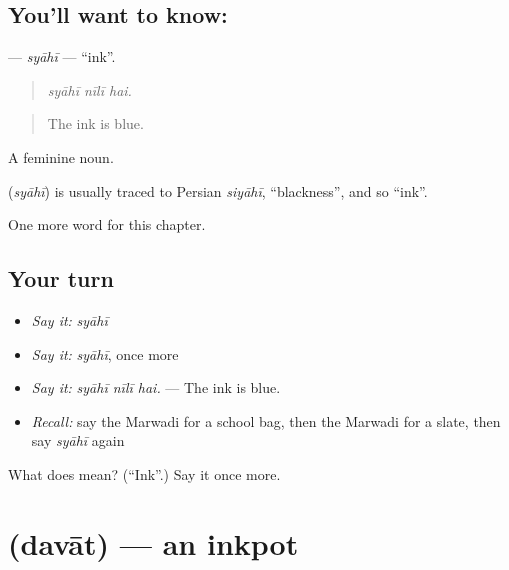 \subsection*{You'll want to know: }
\textbf{} — \emph{syāhī} — \textquotedblleft{}ink\textquotedblright{}.

\begin{quote}
  
\end{quote}

\begin{quote}
\emph{syāhī nīlī hai.}
\end{quote}

\begin{quote}
The ink is blue.
\end{quote}

A feminine noun.

\begin{cousinweb}
\textbf{} (\emph{syāhī}) is usually traced to Persian \emph{siyāhī}, \textquotedblleft{}blackness\textquotedblright{}, and so \textquotedblleft{}ink\textquotedblright{}.
\end{cousinweb}

\begin{grammarlens}[title={What you've built}]
One more word for this chapter.
\end{grammarlens}

\subsection*{Your turn}
\begin{itemize}
\raggedright
  \item \emph{Say it:} \emph{syāhī}
  \item \emph{Say it:} \emph{syāhī}, once more
  \item \emph{Say it:} \emph{syāhī nīlī hai.} — The ink is blue.
  \item \emph{Recall:} say the Marwadi for a school bag, then the Marwadi for a slate, then say \emph{syāhī} again
\end{itemize}

\begin{tcolorbox}[breakable,colback=teal!4,colframe=teal!35!black,title={Before you move on}]
What does  mean? (\textquotedblleft{}Ink\textquotedblright{}.) Say it once more.
\end{tcolorbox}
\section[\texorpdfstring{\mw{दवात} (davāt)}{दवात (davāt)}]{ (davāt) — an inkpot}


